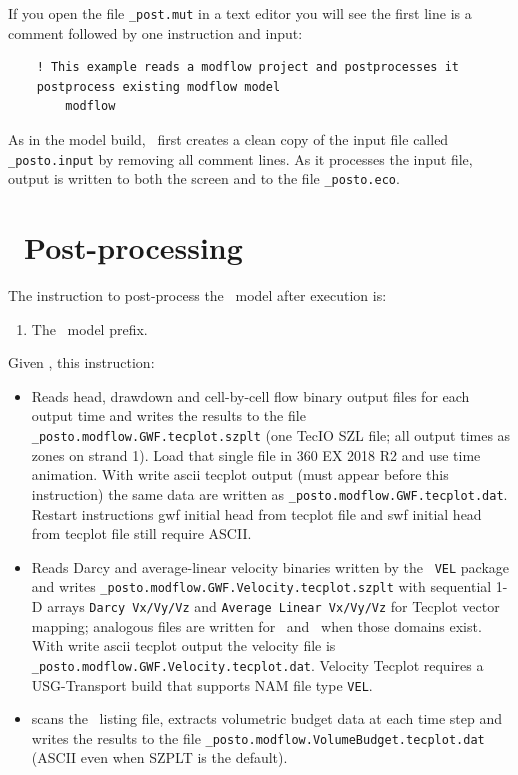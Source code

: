 If you open the file \texttt{\_post.mut} in a text editor you will see the first  line is a comment followed by one instruction and input:
\squish
\begin{verbatim}
    ! This example reads a modflow project and postprocesses it
    postprocess existing modflow model
        modflow
\end{verbatim}
As in the model build, \mut\ first creates a clean copy of the input file called \texttt{\_posto.input} by removing all comment lines.
 As it processes the input file, output is written to both the screen and to the file \texttt{\_posto.eco}.

\section{\mut\ Post-processing}
The instruction to post-process the \mfus\ model after execution is:

    {
        \squish
        \begin{enumerate}
        \item {}  The \mfus\ model prefix.
        \end{enumerate}
         Given , this instruction:
         \begin{itemize}
            \item  Reads head, drawdown and cell-by-cell flow binary output files for each output time and writes the results to the file {\tt \_posto.modflow.GWF.tecplot.szplt} (one TecIO SZL file; all output times as zones on strand 1). Load that single file in 360 EX 2018 R2 and use time animation. With {\sf write ascii tecplot output} (must appear before this instruction) the same data are written as {\tt \_posto.modflow.GWF.tecplot.dat}. Restart instructions {\sf gwf initial head from tecplot file} and {\sf swf initial head from tecplot file} still require ASCII.
            \item  Reads Darcy and average-linear velocity binaries written by the \mfus\ \texttt{VEL} package and writes {\tt \_posto.modflow.GWF.Velocity.tecplot.szplt} with sequential 1-D arrays \texttt{Darcy Vx/Vy/Vz} and \texttt{Average Linear Vx/Vy/Vz} for Tecplot vector mapping; analogous files are written for \cln\ and \swf\ when those domains exist. With {\sf write ascii tecplot output} the velocity file is {\tt \_posto.modflow.GWF.Velocity.tecplot.dat}. Velocity Tecplot requires a USG-Transport build that supports NAM file type \texttt{VEL}.
            \item scans the \mfus\ listing file, extracts volumetric budget data at each time step and writes the results to the file {\tt \_posto.modflow.VolumeBudget.tecplot.dat} (ASCII even when SZPLT is the default).
         \end{itemize}
    }

